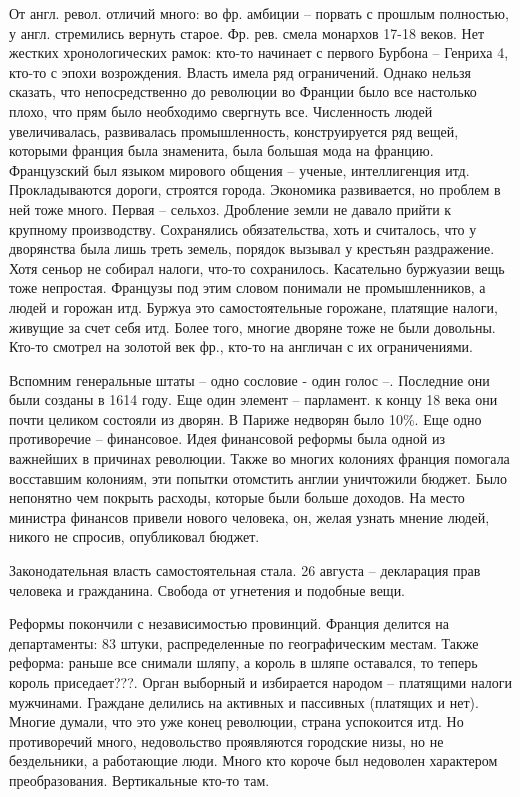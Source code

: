 \documentclass[a4paper, 12pt]{article}
\begin{document}
\begin{multicols}{2}
От англ. револ. отличий много: во фр. амбиции -- порвать с прошлым полностью, у англ. стремились вернуть старое. Фр. рев. смела монархов 17-18 веков. Нет жестких хронологических рамок: кто-то начинает с первого Бурбона -- Генриха 4, кто-то с эпохи возрождения. Власть имела ряд ограничений. Однако нельзя сказать, что непосредственно до революции во Франции было все настолько плохо, что прям было необходимо свергнуть все. Численность людей увеличивалась, развивалась промышленность, конструируется ряд вещей, которыми франция была знаменита, была большая мода на францию. Французский был языком мирового общения -- ученые, интеллигенция итд. Прокладываются дороги, строятся города. Экономика развивается, но проблем в ней тоже много. Первая -- сельхоз. Дробление земли не давало прийти к крупному производству. Сохранялись обязательства, хоть и считалось, что у дворянства была лишь треть земель, порядок вызывал у крестьян раздражение. Хотя сеньор не собирал налоги, что-то сохранилось. Касательно буржуазии вещь тоже непростая. Французы под этим словом понимали не промышленников, а людей и горожан итд. Буржуа это самостоятельные горожане, платящие налоги, живущие за счет себя итд. Более того, многие дворяне тоже не были довольны. Кто-то смотрел на золотой век фр., кто-то на англичан с их ограничениями. 

Вспомним генеральные штаты -- одно сословие - один голос --. Последние они были созданы в 1614 году. Еще один элемент -- парламент. к концу 18 века они почти целиком состояли из дворян. В Париже недворян было 10\%. Еще одно противоречие -- финансовое. Идея финансовой реформы была одной из важнейших в причинах революции. Также во многих колониях франция помогала восставшим колониям, эти попытки отомстить англии уничтожили бюджет. Было непонятно чем покрыть расходы, которые были больше доходов. На место министра финансов привели нового человека, он, желая узнать мнение людей, никого не спросив, опубликовал бюджет. 

Законодательная власть самостоятельная стала. 
26 августа -- декларация прав человека и гражданина. Свобода от угнетения и подобные вещи. 

Реформы покончили с независимостью провинций. Франция делится на департаменты: 83 штуки, распределенные по географическим местам. Также реформа: раньше все снимали шляпу, а король в шляпе оставался, то теперь король приседает???. Орган выборный и избирается народом -- платящими налоги мужчинами. Граждане делились на активных и пассивных (платящих и нет). Многие думали, что это уже конец революции, страна успокоится итд. Но противоречий много, недовольство проявляются городские низы, но не бездельники, а работающие люди. Много кто короче был недоволен характером преобразования. Вертикальные кто-то там. 


\end{multicols}
\end{document}
